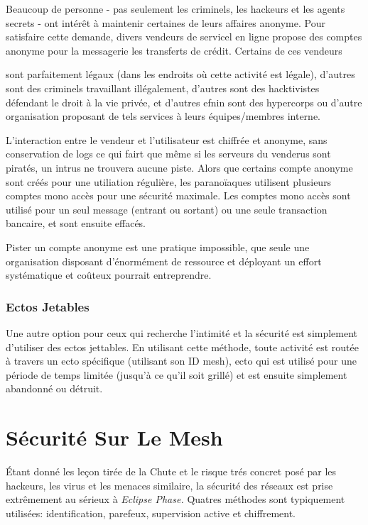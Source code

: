 Beaucoup de personne - pas seulement les criminels, les hackeurs et les agents secrets - ont intérêt à maintenir certaines de leurs affaires anonyme. Pour satisfaire cette demande, divers vendeurs de servicel en ligne propose des comptes anonyme pour la messagerie les transferts de crédit. Certains de ces vendeurs 

sont parfaitement légaux (dans les  endroits où cette activité est légale), d'autres sont des criminels travaillant illégalement, d'autres sont des hacktivistes défendant le droit à la vie privée, et d'autres efnin sont des hypercorps ou d'autre organisation proposant de tels services à leurs équipes/membres interne. 

L'interaction entre le vendeur et l'utilisateur est chiffrée et anonyme, sans conservation de logs ce qui fairt que même si les serveurs du venderus sont piratés, un intrus ne trouvera aucune piste. Alors que certains compte anonyme sont créés pour une utiliation régulière, les paranoïaques utilisent plusieurs comptes mono accès pour une sécurité maximale. Les comptes mono accès sont utilisé pour un seul message (entrant ou sortant) ou une seule transaction bancaire, et sont ensuite effacés. 

Pister un compte anonyme est une pratique impossible, que seule une organisation disposant d'énormément de ressource et déployant un effort systématique et coûteux pourrait entreprendre. 

\subsubsection{Ectos Jetables} 

Une autre option pour ceux qui recherche l'intimité et la sécurité est simplement d'utiliser des ectos jettables. En utilisant cette méthode, toute activité est routée à travers un ecto spécifique (utilisant son ID mesh), ecto qui est utilisé pour une période de temps limitée (jusqu'à ce qu'il soit grillé) et est ensuite simplement abandonné ou détruit. 

\section{Sécurité Sur Le Mesh} 

Étant donné les leçon tirée de la Chute et le risque trés concret posé par les hackeurs, les virus et les menaces similaire, la sécurité des réseaux est prise extrêmement au sérieux à \textit{Eclipse Phase. } Quatres méthodes sont typiquement utilisées: identification, parefeux, supervision active et chiffrement. 

